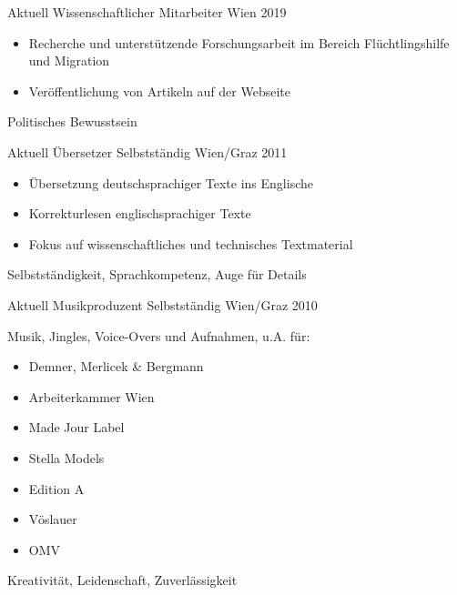 %
%


\begin{experiences}
	\experience
	{Aktuell}
	{Wissenschaftlicher Mitarbeiter}
	{}
	{Wien}
	{2019}
	{
		\begin{itemize}
			\item Recherche und unterstützende Forschungsarbeit im Bereich
			      Flüchtlingshilfe und Migration
			\item Veröffentlichung von Artikeln auf der Webseite
		\end{itemize}
		\smallskip
	}
	{Politisches Bewusstsein}

	\emptySeparator

	\experience
	{Aktuell}
	{Übersetzer}
	{Selbstständig}
	{Wien/Graz}
	{2011}
	{
		\begin{itemize}
			\item Übersetzung deutschsprachiger Texte ins Englische
			\item Korrekturlesen englischsprachiger Texte
			\item Fokus auf wissenschaftliches und technisches Textmaterial
		\end{itemize}
		\smallskip
	}
	{Selbstständigkeit, Sprachkompetenz, Auge für Details}

	\emptySeparator

	\experience
	{Aktuell}
	{Musikproduzent}
	{Selbstständig}
	{Wien/Graz}
	{2010}
	{
		Musik, Jingles, Voice-Overs und Aufnahmen, u.A. für:
		\begin{itemize}
			\item Demner, Merlicek \& Bergmann
			\item Arbeiterkammer Wien
			\item Made Jour Label
			\item Stella Models
			\item Edition A
			\item Vöslauer
			\item OMV
		\end{itemize}
		\smallskip
	}
	{Kreativität, Leidenschaft, Zuverlässigkeit}

	\emptySeparator


\end{experiences}
